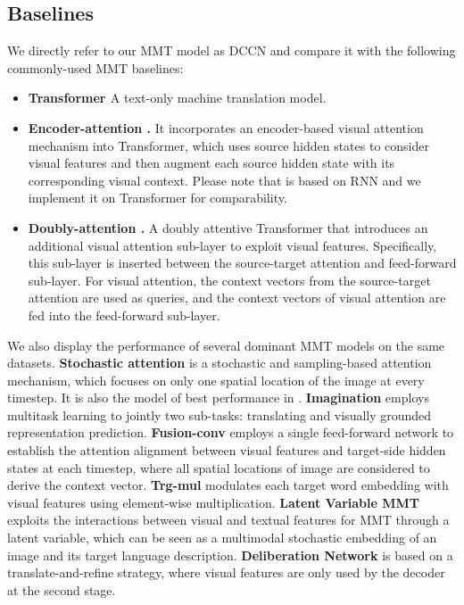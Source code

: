 \documentclass[sigconf]{acmart}
\begin{document}
\subsection{Baselines}
We directly refer to our MMT model as DCCN and compare it with the following commonly-used MMT baselines: 
\begin{itemize}
    \item \textbf{Transformer \cite{vaswani2017attention}}  A text-only machine translation model.
    \item \textbf{Encoder-attention \cite{Delbrouck:NIPS17workshop}.} It incorporates an encoder-based visual attention mechanism into Transformer, which uses source hidden states to consider visual features and then augment each source hidden state with its corresponding visual context. Please note that \cite{Delbrouck:NIPS17workshop} is based on RNN and we implement it on Transformer for comparability.
    \item \textbf{Doubly-attention  \cite{helcl2018cuni}.} A doubly attentive Transformer that introduces an additional visual attention sub-layer to exploit visual features. Specifically, this sub-layer is inserted between the source-target attention and feed-forward sub-layer. For visual attention, the context vectors from the source-target attention are used as queries, and the context vectors of visual attention are fed into the feed-forward sub-layer.
\end{itemize}




We also display the performance of several dominant MMT models on the same datasets.
\textbf{Stochastic attention} \cite{Delbrouck:EMNLP17} is a stochastic and sampling-based attention mechanism, 
which focuses on only one spatial location of the image at every timestep. It is also the model of best performance in \cite{Delbrouck:EMNLP17}. 
\textbf{Imagination} \cite{elliott2017imagination} employs multitask learning to jointly two sub-tasks: translating and visually grounded representation prediction. 
\textbf{Fusion-conv} \cite{caglayan2017lium} employs a single feed-forward network to establish the attention alignment between visual features and target-side hidden states at each timestep, where all spatial locations of image are considered to derive the context vector. 
\textbf{Trg-mul} \cite{caglayan2017lium} modulates each target word embedding with visual features using element-wise multiplication.
\textbf{Latent Variable MMT} \cite{calixto2019latent} exploits the interactions between visual and textual features for MMT through a latent variable, which can be seen as a multimodal stochastic embedding of an image and its target language description. 
\textbf{Deliberation Network} \cite{acl19:twopass} is based on a translate-and-refine strategy, where visual features are only used by the decoder at the second stage.
\end{document}
